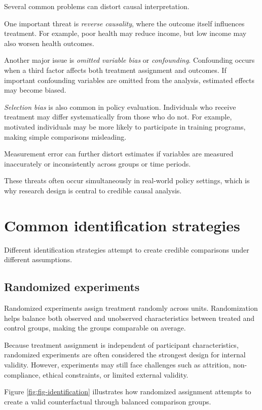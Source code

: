 \documentclass[
  11pt,
  oneside]{book}
\begin{document}
Several common problems can distort causal interpretation.

One important threat is \emph{reverse causality}, where the outcome itself influences treatment. For example, poor health may reduce income, but low income may also worsen health outcomes.

Another major issue is \emph{omitted variable bias} or \emph{confounding}. Confounding occurs when a third factor affects both treatment assignment and outcomes. If important confounding variables are omitted from the analysis, estimated effects may become biased.

\emph{Selection bias} is also common in policy evaluation. Individuals who receive treatment may differ systematically from those who do not. For example, motivated individuals may be more likely to participate in training programs, making simple comparisons misleading.

Measurement error can further distort estimates if variables are measured inaccurately or inconsistently across groups or time periods.

These threats often occur simultaneously in real-world policy settings, which is why research design is central to credible causal analysis.

\section{Common identification strategies}\label{common-identification-strategies}

Different identification strategies attempt to create credible comparisons under different assumptions.

\subsection{Randomized experiments}\label{randomized-experiments}

Randomized experiments assign treatment randomly across units. Randomization helps balance both observed and unobserved characteristics between treated and control groups, making the groups comparable on average.

Because treatment assignment is independent of participant characteristics, randomized experiments are often considered the strongest design for internal validity. However, experiments may still face challenges such as attrition, non-compliance, ethical constraints, or limited external validity.

Figure \ref{fig:fig-identification} illustrates how randomized assignment attempts to create a valid counterfactual through balanced comparison groups.
\end{document}
